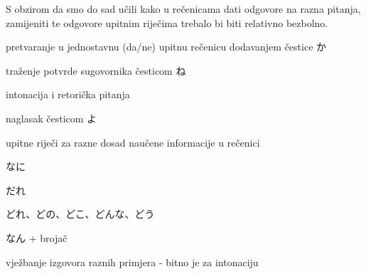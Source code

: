 
\author{Tomislav Mamić}

	
	S obzirom da smo do sad učili kako u rečenicama dati odgovore na razna pitanja, zamijeniti te odgovore upitnim riječima trebalo bi biti relativno bezbolno.
	
	\begin{hyou}
		\item pretvaranje u jednostavnu (da/ne) upitnu rečenicu dodavanjem čestice か
		\item traženje potvrde sugovornika česticom ね
		\item intonacija i retorička pitanja
		\item naglasak česticom よ
		\item upitne riječi za razne dosad naučene informacije u rečenici
		\begin{hyou}
			\item なに
			\item だれ
			\item どれ、どの、どこ、どんな、どう
			\item なん + brojač
		\end{hyou}
		\item vježbanje izgovora raznih primjera - bitno je za intonaciju
	\end{hyou}
